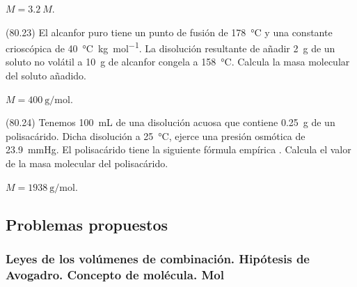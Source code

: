 \documentclass[10pt,a5paper,twoside]{article}
\begin{document}
    \begin{solution}
      \( M = \SI{3.2}{M} \).
    \end{solution}




    \begin{exercise}[
        tags    = {},
        topics  = {química,química básica},
        source  = {FQ 1B MGH 2016, p80, e23},
      ]
      (80.23) El alcanfor puro tiene un punto de fusión de \SI{178}{\celsius} y una constante crioscópica de \SI{40}{\celsius\kilo\gram\per\mole}. La disolución resultante de añadir \SI{2}{\gram} de un soluto no volátil a
      \SI{10}{\gram} de alcanfor congela a \SI{158}{\celsius}. Calcula la masa molecular del soluto añadido.
    \end{exercise}

    \begin{solution}
      \( M = \SI{400}{\gram\per\mole} \).
    \end{solution}




    \begin{exercise}[
        tags    = {},
        topics  = {química,química básica},
        source  = {FQ 1B MGH 2016, p80, e24},
      ]
      (80.24) Tenemos \SI{100}{\milli\liter} de una disolución acuosa que contiene \SI{0.25}{\gram} de un polisacárido. Dicha disolución a \SI{25}{\celsius}, ejerce una presión osmótica de \SI{23.9}{\mmHg}. El polisacárido tiene la siguiente fórmula empírica . Calcula el valor de la masa molecular del polisacárido.
    \end{exercise}

    \begin{solution}
      \( M = \SI{1938}{\gram\per\mole} \).
    \end{solution}







  \subsection*{Problemas propuestos}

    \subsubsection*{Leyes de los volúmenes de combinación. Hipótesis de Avogadro. Concepto de molécula. Mol}
\end{document}
